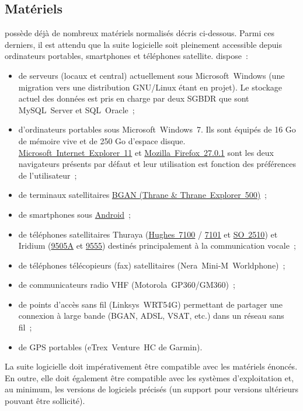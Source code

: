 \subsection{Matériels}
\mo possède déjà de nombreux matériels normalisés décris ci-dessous.
Parmi ces derniers, il est attendu que la suite logicielle soit pleinement accessible depuis ordinateurs portables, smartphones et téléphones satellite.
\mo dispose~:
\begin{itemize}
	\item de serveurs (locaux et central) actuellement sous Microsoft~Windows (une migration vers une distribution GNU/Linux étant en projet).
		Le stockage actuel des données est pris en charge par deux SGBDR que sont MySQL~Server et SQL~Oracle~;
	\item d'ordinateurs portables sous Microsoft~Windows~7.
		Ils sont équipés de 16 Go de mémoire vive et de 250 Go d'espace disque.
		\href{https://www.microsoft.com/fr-fr/download/internet-explorer.aspx}{Microsoft~Internet~Explorer~11} et \href{http://www.mozilla.org/en-US/firefox/27.0.1/releasenotes/}{Mozilla~Firefox~27.0.1} sont les deux navigateurs présents par défaut et leur utilisation est fonction des préférences de l'utilisateur~;
	\item de terminaux satellitaires \href{http://explorersatellite.com/BGAN/thrane_thrane_bgan.html}{BGAN (Thrane \& Thrane~Explorer~500)}~;
	\item de smartphones sous \href{http://www.android.com/}{Android}~;
	\item de téléphones satellitaires Thuraya (\href{http://www.thuraya.com.kw/hughes7101.html}{Hughes~7100} / \href{http://www.thuraya.com.kw/hughes7100.html}{7101} et \href{http://www.thuraya.com.kw/so-2510.html}{SO~2510}) et Iridium (\href{http://www.iridium.com/products/Iridium-9505A-Satellite-Phone.aspx}{9505A} et \href{http://www.iridium.com/products/Iridium9555SatellitePhone.aspx}{9555}) destinés principalement à la communication vocale~;
	\item de téléphones télécopieurs (fax) satellitaires (Nera~Mini-M~Worldphone)~;
	\item de communicateurs radio VHF (Motorola~GP360/GM360)~;
	\item de points d'accès sans fil (Linksys~WRT54G) permettant de partager une connexion à large bande (BGAN, ADSL, VSAT, etc.) dans un réseau sans fil~;
	\item de GPS portables (eTrex~Venture~HC de Garmin).
\end{itemize}
\begin{constraint}
	La suite logicielle doit impérativement être compatible avec les matériels énoncés.
	En outre, elle doit également être compatible avec les systèmes d'exploitation et, au minimum, les versions de logiciels précisés (un support pour versions ultérieurs pouvant être sollicité).
\end{constraint}
